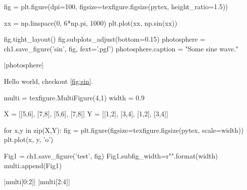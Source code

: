 \begin{pycode}[chapter1]
fig = plt.figure(dpi=100, figsize=texfigure.figsize(pytex, height_ratio=1.5))

xx = np.linspace(0, 6*np.pi, 1000)
plt.plot(xx, np.sin(xx))

fig.tight_layout()
fig.subplots_adjust(bottom=0.15)
photosphere = ch1.save_figure('sin', fig, fext='.pgf')
photosphere.caption = "Some sine wave."
\end{pycode}

\py[chapter1]|photosphere|



Hello world, checkout \cref{fig:sin}.


\begin{pycode}[chapter1]
	
multi = texfigure.MultiFigure(4,1)
width = 0.9

X = [[5,6], [7,8], [5,6], [7,8]]
Y = [[1,2], [3,4], [1,2], [3,4]]

for x,y in zip(X,Y):
	fig = plt.figure(figsize=texfigure.figsize(pytex, scale=width))
	plt.plot(x, y, 'o')
	
	Fig1 = ch1.save_figure('test', fig)
	Fig1.subfig_width=r"{}\columnwidth".format(width)
	multi.append(Fig1)
\end{pycode}

\py[chapter1]|multi[0:2]|
\py[chapter1]|multi[2:4]|